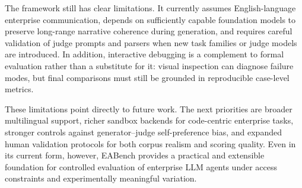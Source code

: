 \documentclass[journal,dvipsnames]{acmart}
\begin{document}
The framework still has clear limitations. It currently assumes English-language enterprise communication, depends on sufficiently capable foundation models to preserve long-range narrative coherence during generation, and requires careful validation of judge prompts and parsers when new task families or judge models are introduced. In addition, interactive debugging is a complement to formal evaluation rather than a substitute for it: visual inspection can diagnose failure modes, but final comparisons must still be grounded in reproducible case-level metrics.

These limitations point directly to future work. The next priorities are broader multilingual support, richer sandbox backends for code-centric enterprise tasks, stronger controls against generator--judge self-preference bias, and expanded human validation protocols for both corpus realism and scoring quality. Even in its current form, however, EABench provides a practical and extensible foundation for controlled evaluation of enterprise LLM agents under access constraints and experimentally meaningful variation.






\end{document}
